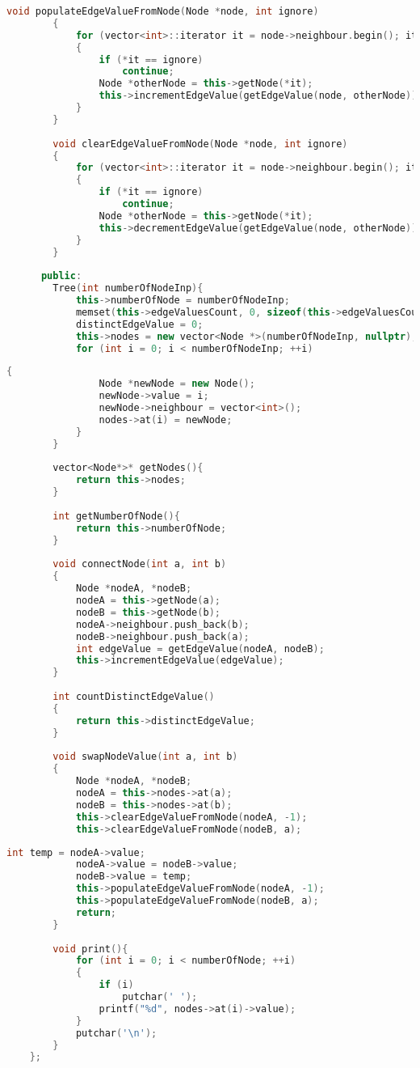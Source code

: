 	\pagebreak
	\begin{lstlisting}[language=C++, firstnumber=32]
		void populateEdgeValueFromNode(Node *node, int ignore)
		{
			for (vector<int>::iterator it = node->neighbour.begin(); it != node->neighbour.end(); ++it)
			{
				if (*it == ignore)
					continue;
				Node *otherNode = this->getNode(*it);
				this->incrementEdgeValue(getEdgeValue(node, otherNode));
			}
		}
	
		void clearEdgeValueFromNode(Node *node, int ignore)
		{
			for (vector<int>::iterator it = node->neighbour.begin(); it != node->neighbour.end(); ++it)
			{
				if (*it == ignore)
					continue;
				Node *otherNode = this->getNode(*it);
				this->decrementEdgeValue(getEdgeValue(node, otherNode));
			}
		}
	
	  public:
		Tree(int numberOfNodeInp){
			this->numberOfNode = numberOfNodeInp;
			memset(this->edgeValuesCount, 0, sizeof(this->edgeValuesCount));
			distinctEdgeValue = 0;
			this->nodes = new vector<Node *>(numberOfNodeInp, nullptr);
			for (int i = 0; i < numberOfNodeInp; ++i)
		\end{lstlisting}
		\pagebreak
		\begin{lstlisting}[language=C++, firstnumber=62]
			{
				Node *newNode = new Node();
				newNode->value = i;
				newNode->neighbour = vector<int>();
				nodes->at(i) = newNode;
			}
		}
	
		vector<Node*>* getNodes(){
			return this->nodes;
		}
	
		int getNumberOfNode(){
			return this->numberOfNode;
		}
	
		void connectNode(int a, int b)
		{
			Node *nodeA, *nodeB;
			nodeA = this->getNode(a);
			nodeB = this->getNode(b);
			nodeA->neighbour.push_back(b);
			nodeB->neighbour.push_back(a);
			int edgeValue = getEdgeValue(nodeA, nodeB);
			this->incrementEdgeValue(edgeValue);
		}
	
		int countDistinctEdgeValue()
		{
			return this->distinctEdgeValue;
		}
	
		void swapNodeValue(int a, int b)
		{
			Node *nodeA, *nodeB;
			nodeA = this->nodes->at(a);
			nodeB = this->nodes->at(b);
			this->clearEdgeValueFromNode(nodeA, -1);
			this->clearEdgeValueFromNode(nodeB, a);
		\end{lstlisting}
		\pagebreak
		\begin{lstlisting}[language=C++, caption=Implementasi Kelas \textit{Tree}, label=code:class_tree, firstnumber=102]
			int temp = nodeA->value;
			nodeA->value = nodeB->value;
			nodeB->value = temp;
			this->populateEdgeValueFromNode(nodeA, -1);
			this->populateEdgeValueFromNode(nodeB, a);
			return;
		}
	
		void print(){
			for (int i = 0; i < numberOfNode; ++i)
			{
				if (i)
					putchar(' ');
				printf("%d", nodes->at(i)->value);
			}
			putchar('\n');
		}
	};
\end{lstlisting}

